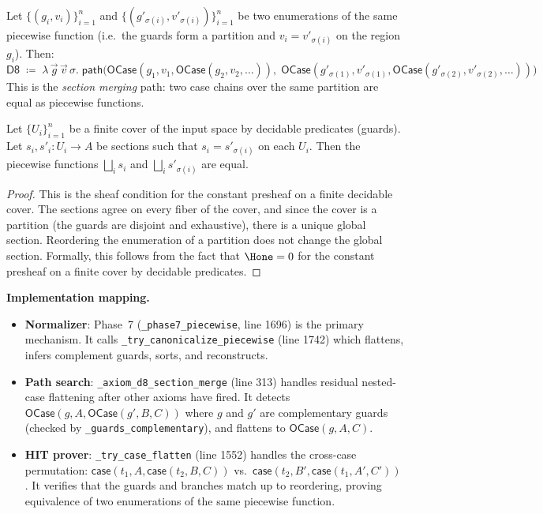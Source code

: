 \begin{definition}
\label{def:d8-path}
Let $\{(g_i, v_i)\}_{i=1}^{n}$ and $\{(g'_{\sigma(i)},
v'_{\sigma(i)})\}_{i=1}^{n}$ be two enumerations of the same
piecewise function (i.e.\ the guards form a partition and
$v_i = v'_{\sigma(i)}$ on the region $g_i$).  Then:
\[
  \mathsf{D8} \;\coloneqq\; \lambda\, \vec{g}\, \vec{v}\, \sigma.\;
  \mathsf{path}\!\big(
    \mathsf{OCase}(g_1, v_1, \mathsf{OCase}(g_2, v_2, \ldots)),\;
    \mathsf{OCase}(g'_{\sigma(1)}, v'_{\sigma(1)},
      \mathsf{OCase}(g'_{\sigma(2)}, v'_{\sigma(2)}, \ldots))
  \big)
\]
This is the \emph{section merging} path: two case chains over the
same partition are equal as piecewise functions.
\end{definition}

\begin{theorem}
\label{thm:d8-sound}
Let $\{U_i\}_{i=1}^{n}$ be a finite cover of the input space by
decidable predicates (guards).  Let $s_i, s'_i : U_i \to A$ be
sections such that $s_i = s'_{\sigma(i)}$ on each $U_i$.  Then
the piecewise functions $\bigsqcup_i s_i$ and
$\bigsqcup_i s'_{\sigma(i)}$ are equal.
\end{theorem}

\begin{proof}
This is the sheaf condition for the constant presheaf on a finite
decidable cover.  The sections agree on every fiber of the cover, and
since the cover is a partition (the guards are disjoint and
exhaustive), there is a unique global section.  Reordering the
enumeration of a partition does not change the global section.
Formally, this follows from the fact that $\Hone = 0$ for the
constant presheaf on a finite cover by decidable predicates.
\end{proof}

\textbf{Implementation mapping.}
\begin{itemize}
  \item \textbf{Normalizer}: Phase~7 (\texttt{\_phase7\_piecewise},
    line 1696) is the primary mechanism.  It calls
    \texttt{\_try\_canonicalize\_piecewise} (line 1742) which
    flattens, infers complement guards, sorts, and reconstructs.
  \item \textbf{Path search}: \texttt{\_axiom\_d8\_section\_merge}
    (line 313) handles residual nested-case flattening after other
    axioms have fired.  It detects
    $\mathsf{OCase}(g, A, \mathsf{OCase}(g', B, C))$ where $g$
    and $g'$ are complementary guards (checked by
    \texttt{\_guards\_complementary}), and flattens to
    $\mathsf{OCase}(g, A, C)$.
  \item \textbf{HIT prover}: \texttt{\_try\_case\_flatten}
    (line 1552) handles the cross-case permutation:
    $\mathsf{case}(t_1, A, \mathsf{case}(t_2, B, C))$ vs.\
    $\mathsf{case}(t_2, B', \mathsf{case}(t_1, A', C'))$.
    It verifies that the guards and branches match up to
    reordering, proving equivalence of two enumerations of the
    same piecewise function.
\end{itemize}

